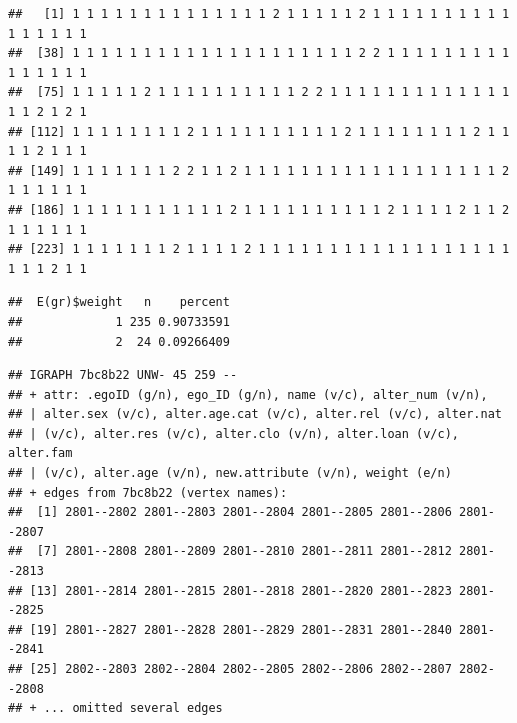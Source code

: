 \documentclass[
]{book}
\newenvironment{Shaded}{\begin{snugshade}}{\end{snugshade}}
\newcommand{\CommentTok}[1]{\textcolor[rgb]{0.56,0.35,0.01}{\textit{#1}}}
\newcommand{\DecValTok}[1]{\textcolor[rgb]{0.00,0.00,0.81}{#1}}
\newcommand{\FunctionTok}[1]{\textcolor[rgb]{0.13,0.29,0.53}{\textbf{#1}}}
\newcommand{\NormalTok}[1]{#1}
\newcommand{\OtherTok}[1]{\textcolor[rgb]{0.56,0.35,0.01}{#1}}
\newcommand{\SpecialCharTok}[1]{\textcolor[rgb]{0.81,0.36,0.00}{\textbf{#1}}}
\begin{document}
\begin{Shaded}
\end{Shaded}

\begin{verbatim}
##   [1] 1 1 1 1 1 1 1 1 1 1 1 1 1 1 2 1 1 1 1 1 2 1 1 1 1 1 1 1 1 1 1 1 1 1 1 1 1
##  [38] 1 1 1 1 1 1 1 1 1 1 1 1 1 1 1 1 1 1 1 1 2 2 1 1 1 1 1 1 1 1 1 1 1 1 1 1 1
##  [75] 1 1 1 1 1 2 1 1 1 1 1 1 1 1 1 1 2 2 1 1 1 1 1 1 1 1 1 1 1 1 1 1 1 2 1 2 1
## [112] 1 1 1 1 1 1 1 1 2 1 1 1 1 1 1 1 1 1 1 2 1 1 1 1 1 1 1 1 2 1 1 1 1 2 1 1 1
## [149] 1 1 1 1 1 1 1 2 2 1 1 2 1 1 1 1 1 1 1 1 1 1 1 1 1 1 1 1 1 1 2 1 1 1 1 1 1
## [186] 1 1 1 1 1 1 1 1 1 1 1 2 1 1 1 1 1 1 1 1 1 1 2 1 1 1 1 2 1 1 2 1 1 1 1 1 1
## [223] 1 1 1 1 1 1 1 2 1 1 1 1 2 1 1 1 1 1 1 1 1 1 1 1 1 1 1 1 1 1 1 1 1 1 2 1 1
\end{verbatim}

\begin{Shaded}
\end{Shaded}

\begin{verbatim}
##  E(gr)$weight   n    percent
##             1 235 0.90733591
##             2  24 0.09266409
\end{verbatim}

\begin{Shaded}
\end{Shaded}

\begin{verbatim}
## IGRAPH 7bc8b22 UNW- 45 259 -- 
## + attr: .egoID (g/n), ego_ID (g/n), name (v/c), alter_num (v/n),
## | alter.sex (v/c), alter.age.cat (v/c), alter.rel (v/c), alter.nat
## | (v/c), alter.res (v/c), alter.clo (v/n), alter.loan (v/c), alter.fam
## | (v/c), alter.age (v/n), new.attribute (v/n), weight (e/n)
## + edges from 7bc8b22 (vertex names):
##  [1] 2801--2802 2801--2803 2801--2804 2801--2805 2801--2806 2801--2807
##  [7] 2801--2808 2801--2809 2801--2810 2801--2811 2801--2812 2801--2813
## [13] 2801--2814 2801--2815 2801--2818 2801--2820 2801--2823 2801--2825
## [19] 2801--2827 2801--2828 2801--2829 2801--2831 2801--2840 2801--2841
## [25] 2802--2803 2802--2804 2802--2805 2802--2806 2802--2807 2802--2808
## + ... omitted several edges
\end{verbatim}
\end{document}
